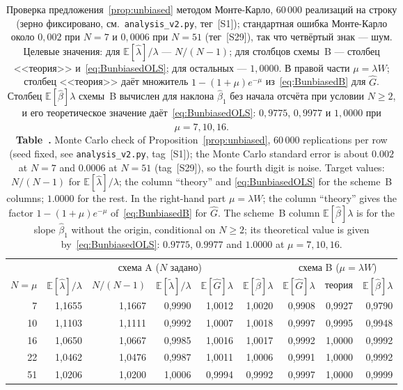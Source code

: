 \documentclass[11pt,a4paper]{article}
\newcommand{\encaptab}[1]{\\[3pt]\foreignlanguage{english}{%
  \textbf{Table~\thetable.} #1}}
\theoremstyle{plain}
\theoremstyle{remark}
\begin{document}
\begin{table}[t]
\centering
\caption{Проверка предложения~\ref{prop:unbiased} методом Монте-Карло,
$60\,000$ реализаций на строку (зерно фиксировано, см.\ \texttt{analysis\_v2.py},
тег~[S1]); стандартная ошибка Монте-Карло около $0{,}002$ при $N=7$ и $0{,}0006$ при
$N=51$ (тег~[S29]), так что четвёртый знак --- шум. Целевые значения: для $\mathbb E[\hat\lambda]/\lambda$ --- $N/(N-1)$; для
столбцов схемы~B --- столбец <<теория>> и~\eqref{eq:BunbiasedOLS}; для остальных ---
$1{,}0000$.
В правой части $\mu=\lambda W$; столбец <<теория>> даёт множитель
$1-(1+\mu)e^{-\mu}$ из~\eqref{eq:BunbiasedB} для $\hat G$. Столбец
$\mathbb E[\hat\beta]\lambda$ схемы~B вычислен для наклона $\hat\beta_1$ без начала
отсчёта при условии $N\ge2$, и его теоретическое значение
даёт~\eqref{eq:BunbiasedOLS}: $0{,}9775$, $0{,}9977$ и $1{,}0000$ при $\mu=7,10,16$.
\encaptab{Monte Carlo check of Proposition~\ref{prop:unbiased}, $60\,000$
replications per row (seed fixed, see \texttt{analysis\_v2.py}, tag~[S1]); the
Monte Carlo standard error is about $0.002$ at $N=7$ and $0.0006$ at $N=51$
(tag~[S29]), so the fourth digit is noise. Target
values: $N/(N-1)$ for $\mathbb E[\hat\lambda]/\lambda$; the column ``theory'' and
\eqref{eq:BunbiasedOLS} for the scheme~B columns; $1.0000$ for the rest. In the right-hand
part $\mu=\lambda W$; the column ``theory'' gives the factor
$1-(1+\mu)e^{-\mu}$ of~\eqref{eq:BunbiasedB} for $\hat G$. The scheme~B column
$\mathbb E[\hat\beta]\lambda$ is for the slope $\hat\beta_1$ without the origin,
conditional on $N\ge2$; its theoretical value is given
by~\eqref{eq:BunbiasedOLS}: $0.9775$, $0.9977$ and $1.0000$ at $\mu=7,10,16$.}}
\label{tab:mc}
\small
\begin{tabular}{rrrrrr@{\qquad}rrr}
\toprule
& \multicolumn{5}{c}{схема A ($N$ задано)} & \multicolumn{3}{c}{схема B ($\mu=\lambda W$)}\\
\cmidrule(r){2-6}\cmidrule(l){7-9}
$N=\mu$ & $\mathbb E[\hat\lambda]/\lambda$ & $N/(N-1)$
& $\mathbb E[\tilde\lambda]/\lambda$ & $\mathbb E[\hat G]\lambda$
& $\mathbb E[\hat\beta]\lambda$
& $\mathbb E[\hat G]\lambda$ & теория & $\mathbb E[\hat\beta]\lambda$\\
\midrule
7 & 1{,}1655 & 1{,}1667 & 0{,}9990 & 1{,}0012 & 1{,}0020 & 0{,}9908 & 0{,}9927 & 0{,}9790\\
10 & 1{,}1103 & 1{,}1111 & 0{,}9992 & 1{,}0007 & 1{,}0018 & 0{,}9997 & 0{,}9995 & 0{,}9948\\
16 & 1{,}0650 & 1{,}0667 & 0{,}9985 & 1{,}0016 & 1{,}0017 & 0{,}9992 & 1{,}0000 & 0{,}9992\\
22 & 1{,}0462 & 1{,}0476 & 0{,}9987 & 1{,}0011 & 1{,}0006 & 0{,}9991 & 1{,}0000 & 0{,}9992\\
51 & 1{,}0206 & 1{,}0200 & 1{,}0006 & 0{,}9994 & 0{,}9992 & 0{,}9997 & 1{,}0000 & 0{,}9999\\
\bottomrule
\end{tabular}
\end{table}
\end{document}
